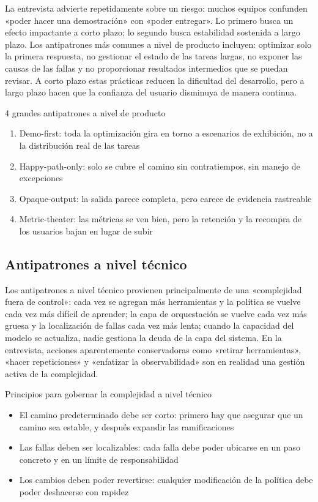 \documentclass[a4paper]{article}
\begin{document}
La entrevista advierte repetidamente sobre un riesgo: muchos equipos confunden «poder hacer una demostración» con «poder entregar». Lo primero busca un efecto impactante a corto plazo; lo segundo busca estabilidad sostenida a largo plazo. Los antipatrones más comunes a nivel de producto incluyen: optimizar solo la primera respuesta, no gestionar el estado de las tareas largas, no exponer las causas de las fallas y no proporcionar resultados intermedios que se puedan revisar. A corto plazo estas prácticas reducen la dificultad del desarrollo, pero a largo plazo hacen que la confianza del usuario disminuya de manera continua.

\begin{warningbox}{4 grandes antipatrones a nivel de producto}
\begin{enumerate}
    \item Demo-first: toda la optimización gira en torno a escenarios de exhibición, no a la distribución real de las tareas
    \item Happy-path-only: solo se cubre el camino sin contratiempos, sin manejo de excepciones
    \item Opaque-output: la salida parece completa, pero carece de evidencia rastreable
    \item Metric-theater: las métricas se ven bien, pero la retención y la recompra de los usuarios bajan en lugar de subir
\end{enumerate}
\end{warningbox}

\subsection{Antipatrones a nivel técnico}

Los antipatrones a nivel técnico provienen principalmente de una «complejidad fuera de control»: cada vez se agregan más herramientas y la política se vuelve cada vez más difícil de aprender; la capa de orquestación se vuelve cada vez más gruesa y la localización de fallas cada vez más lenta; cuando la capacidad del modelo se actualiza, nadie gestiona la deuda de la capa del sistema. En la entrevista, acciones aparentemente conservadoras como «retirar herramientas», «hacer repeticiones» y «enfatizar la observabilidad» son en realidad una gestión activa de la complejidad.

\begin{knowledgebox}{Principios para gobernar la complejidad a nivel técnico}
\begin{itemize}
    \item El camino predeterminado debe ser corto: primero hay que asegurar que un camino sea estable, y después expandir las ramificaciones
    \item Las fallas deben ser localizables: cada falla debe poder ubicarse en un paso concreto y en un límite de responsabilidad
    \item Los cambios deben poder revertirse: cualquier modificación de la política debe poder deshacerse con rapidez
\end{itemize}
\end{knowledgebox}
\end{document}
